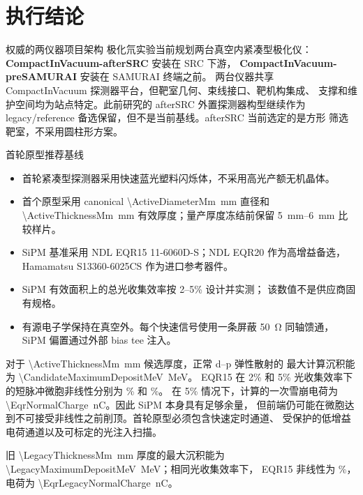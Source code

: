 \documentclass[UTF8,10pt,letterpaper,fontset=none]{ctexart}
\begin{document}
\hypersetup{pageanchor=true}
\tableofcontents
\clearpage
{}

\section{执行结论}

\begin{decisionbox}{权威的两仪器项目架构}
  极化氘实验当前规划两台真空内紧凑型极化仪：
  \textbf{CompactInVacuum-afterSRC} 安装在 SRC 下游，
  \textbf{CompactInVacuum-preSAMURAI} 安装在 SAMURAI 终端之前。
  两台仪器共享 CompactInVacuum 探测器平台，但靶室几何、束线接口、靶机构集成、
  支撑和维护空间均为站点特定。此前研究的 afterSRC 外置探测器构型继续作为
  legacy/reference 备选保留，但不是当前基线。afterSRC 当前选定的是方形
  筛选靶室，不采用圆柱形方案。
\end{decisionbox}

\begin{decisionbox}{首轮原型推荐基线}
  \begin{itemize}
    \item 首轮紧凑型探测器采用快速蓝光塑料闪烁体，不采用高光产额无机晶体。
    \item 首个原型采用 canonical \SI{\ActiveDiameterMm}{\milli\meter} 直径和
      \SI{\ActiveThicknessMm}{\milli\meter} 有效厚度；量产厚度冻结前保留
      \SIrange{5}{6}{\milli\meter} 比较样片。
    \item SiPM 基准采用 NDL EQR15 11-6060D-S；NDL EQR20 作为高增益备选，
      Hamamatsu S13360-6025CS 作为进口参考器件。
    \item SiPM 有效面积上的总光收集效率按 2--5\% 设计并实测；
      该数值不是供应商固有规格。
    \item 有源电子学保持在真空外。每个快速信号使用一条屏蔽
      \SI{50}{\ohm} 同轴馈通，SiPM 偏置通过外部 bias tee 注入。
  \end{itemize}
\end{decisionbox}

对于 \SI{\ActiveThicknessMm}{\milli\meter} 候选厚度，正常 d--p 弹性散射的
最大计算沉积能为 \SI{\CandidateMaximumDepositMeV}{\mega\electronvolt}。
EQR15 在 2\% 和 5\% 光收集效率下的短脉冲微胞非线性分别为
\EqrNormalNonlinearityTwo\% 和 \EqrNormalNonlinearityFive\%。
在 5\% 情况下，计算的一次雪崩电荷为
\SI{\EqrNormalCharge}{\nano\coulomb}。因此 SiPM 本身具有足够余量，
但前端仍可能在微胞达到不可接受非线性之前削顶。首轮原型必须包含快速定时通道、
受保护的低增益电荷通道以及可标定的光注入扫描。

旧 \SI{\LegacyThicknessMm}{\milli\meter} 厚度的最大沉积能为
\SI{\LegacyMaximumDepositMeV}{\mega\electronvolt}；相同光收集效率下，
EQR15 非线性为 \EqrLegacyNormalNonlinearityFive\%，电荷为
\SI{\EqrLegacyNormalCharge}{\nano\coulomb}。
\end{document}
